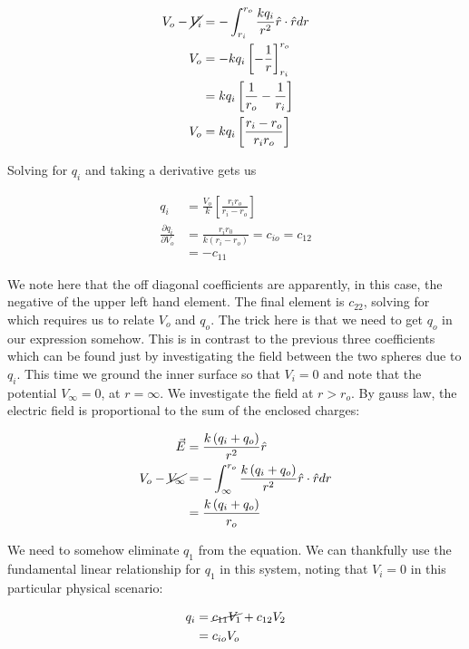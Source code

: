 \documentclass[paper=a4, fontsize=11pt]{scrartcl} %
\numberwithin{equation}{section} %
\numberwithin{figure}{section} %
\numberwithin{table}{section} %
\begin{document}
\begin{align}
V_o - \cancel{V_i} &= -\int_{r_i}^{r_o} \frac{k q_i}{r^2}\hat{r}\cdot\hat{r}dr \\
V_o &= - k q_i \left[ - \frac{1}{r}\right]_{r_i}^{r_o} \\
&=  k q_i \left[\frac{1}{r_o} - \frac{1}{r_i}\right] \\
V_o &=  k q_i \left[\frac{r_i - r_o}{r_i r_o}\right] \\
\end{align}  

Solving for $q_i$ and taking a derivative gets us

\begin{align}
q_i &= \frac{V_o}{k}\left[\frac{r_i r_o}{r_i - r_o}\right] \\
\frac{\partial q_i}{\partial V_o} &= \frac{r_i r_0}{k\left(r_i - r_o\right)} = c_{io} = c_{12}\\
&= - c_{11}
\end{align}

We note here that the off diagonal coefficients are apparently, in this case, the negative of the upper left hand element. The final element is $c_{22}$, solving for which requires us to relate $V_o$ and $q_o$. The trick here is that we need to get $q_o$ in our expression somehow. This is in contrast to the previous three coefficients which can be found just by investigating the field between the two spheres due to $q_i$. This time we ground the inner surface so that $V_i = 0$ and note that the potential $V_\infty = 0$, at $r = \infty$. We investigate the field at $r > r_o$. By gauss law, the electric field is proportional to the sum of the enclosed charges:

\begin{align}
\vec{E} &= \frac{k \left(q_i + q_o\right)}{r^2}\hat{r} \\
V_o - \cancel{V_\infty} &= -\int_{\infty}^{r_o} \frac{k \left(q_i + q_o\right)}{r^2}\hat{r}\cdot\hat{r}dr \\
&= \frac{k\left(q_i + q_o\right)}{r_o}
\end{align}    

We need to somehow eliminate $q_1$ from the equation. We can thankfully use the fundamental linear relationship for $q_1$ in this system, noting that $V_i = 0$ in this particular physical scenario:

\begin{align}
q_i &= \cancel{c_{11}V_1} + c_{12}V_2 \\
&= c_{io}V_o
\end{align}
\end{document}
